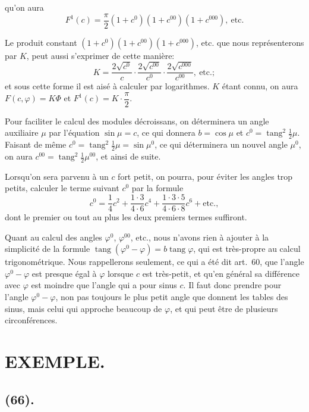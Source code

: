 \documentclass{article}
\begin{document}
qu'on aura
\[ F^{1}(c)=\frac{\pi}{2}(1+c^{0})(1+c^{00})(1+c^{000}),\ \text{etc.} \]

Le produit constant $(1+c^{0})(1+c^{00})(1+c^{000})$, etc. que nous représenterons par $K$, peut aussi s'exprimer de cette manière:
\[ K=\frac{2\sqrt{c^{0}}}{c}\cdot\frac{2\sqrt{c^{00}}}{c^{0}}\cdot\frac{2\sqrt{c^{000}}}{c^{00}},\ \text{etc.}; \]
et sous cette forme il est aisé à calculer par logarithmes. $K$ étant connu, on aura $F(c,\varphi)=K\Phi$ et $F^{1}(c)=K\cdot\dfrac{\pi}{2}$.

Pour faciliter le calcul des modules décroissans, on déterminera un angle auxiliaire $\mu$ par l'équation $\sin\mu=c$, ce qui donnera $b=\cos\mu$ et $c^{0}=\operatorname{tang}^{2}\frac{1}{2}\mu$. Faisant de même $c^{0}=\operatorname{tang}^{2}\frac{1}{2}\mu=\sin\mu^{0}$, ce qui déterminera un nouvel angle $\mu^{0}$, on aura $c^{00}=\operatorname{tang}^{2}\frac{1}{2}\mu^{00}$, et ainsi de suite.

Lorsqu'on sera parvenu à un $c$ fort petit, on pourra, pour éviter les angles trop petits, calculer le terme suivant $c^{0}$ par la formule
\[ c^{0}=\frac{1}{4}c^{2}+\frac{1\cdot3}{4\cdot6}c^{4}+\frac{1\cdot3\cdot5}{4\cdot6\cdot8}c^{6}+\text{etc.}, \]
dont le premier ou tout au plus les deux premiers termes suffiront.

Quant au calcul des angles $\varphi^{0}$, $\varphi^{00}$, etc., nous n'avons rien à ajouter à la simplicité de la formule $\operatorname{tang}(\varphi^{0}-\varphi)=b\operatorname{tang}\varphi$, qui est très-propre au calcul trigonométrique. Nous rappellerons seulement, ce qui a été dit art.~60, que l'angle $\varphi^{0}-\varphi$ est presque égal à $\varphi$ lorsque $c$ est très-petit, et qu'en général sa différence avec $\varphi$ est moindre que l'angle qui a pour sinus $c$. Il faut donc prendre pour l'angle $\varphi^{0}-\varphi$, non pas toujours le plus petit angle que donnent les tables des sinus, mais celui qui approche beaucoup de $\varphi$, et qui peut être de plusieurs circonférences.

\section*{EXEMPLE.}

\subsection*{(66).}
\end{document}
